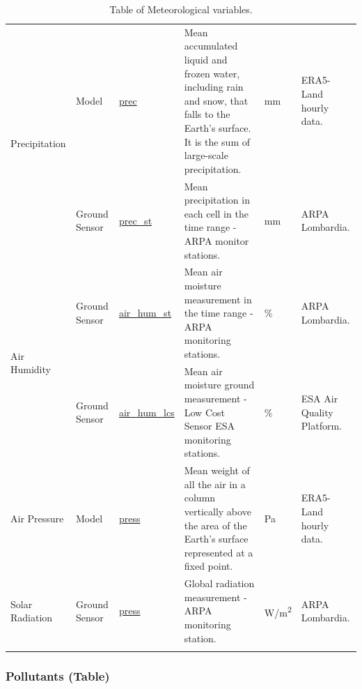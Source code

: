 \begin{center}
\begin{longtable}{ |p{2cm}|p{1.5cm}|p{2.3cm}|p{4cm}|p{1cm}|p{2cm}| }
\multirow{2}{4em}{Precipitation} & Model  & \underline{prec} & Mean accumulated liquid and frozen water, including rain and snow, that falls to the Earth's surface. It is the sum of large-scale precipitation. \par & mm & ERA5-Land hourly data.\\ 
& Ground \newline Sensor  & \underline{prec\_st} &  Mean precipitation in each cell in the time range - ARPA monitor stations. \par & mm & ARPA \newline Lombardia.\\ \hline

\multirow{2}{4em}{Air Humidity} & Ground \newline Sensor  & \underline{air\_hum\_st} & Mean air moisture measurement in the time range - ARPA monitoring stations.\par & \% & ARPA \newline Lombardia.\\ 
& Ground \newline Sensor  & \underline{air\_hum\_lcs} &  Mean air moisture ground measurement - Low Cost Sensor ESA monitoring stations.\par & \% & ESA Air Quality Platform.\\ \hline

\multirow{1}{4em}{Air Pressure} & Model   & \underline{press} & Mean weight of all the air in a column vertically above the area of the Earth's surface represented at a fixed point.\par & Pa & ERA5-Land hourly data.\\ \hline

\multirow{1}{4em}{Solar Radiation} & Ground \newline Sensor  & \underline{press} & Global radiation measurement - ARPA monitoring station.\par & W/m\textsuperscript{2} & ARPA \newline Lombardia.\\ \hline

\hline
\caption{Table of Meteorological variables.}

\end{longtable}
\end{center}

\subsubsection{Pollutants (Table)}



